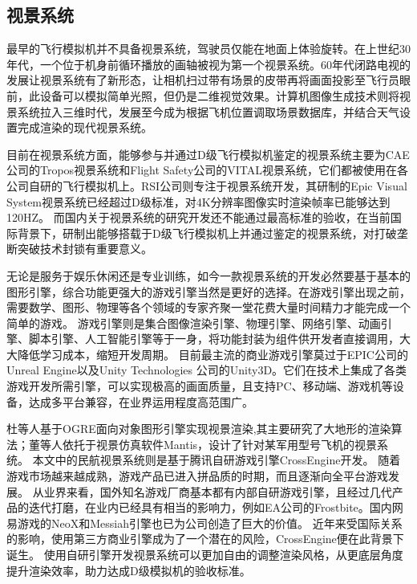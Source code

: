 \subsection{视景系统}
最早的飞行模拟机并不具备视景系统，驾驶员仅能在地面上体验旋转。在上世纪30年代，一个位于机身前循环播放的画轴被视为第一个视景系统。60年代闭路电视的发展让视景系统有了新形态，让相机扫过带有场景的皮带再将画面投影至飞行员眼前\cite{vishis1}，此设备可以模拟简单光照，但仍是二维视觉效果。计算机图像生成技术则将视景系统拉入三维时代，发展至今成为根据飞机位置调取场景数据库，并结合天气设置完成渲染的现代视景系统\cite{vishis2}。
\par
目前在视景系统方面，能够参与并通过D级飞行模拟机鉴定的视景系统主要为CAE公司的Tropos视景系统和Flight Safety公司的VITAL视景系统\cite{vishis3}，它们都被使用在各公司自研的飞行模拟机上。RSI公司则专注于视景系统开发，其研制的Epic Visual System视景系统已经超过D级标准，对4K分辨率图像实时渲染帧率已能够达到120HZ\cite{simhis4}。
而国内关于视景系统的研究开发还不能通过最高标准的验收，在当前国际背景下，研制出能够搭载于D级飞行模拟机上并通过鉴定的视景系统，对打破垄断突破技术封锁有重要意义。
\par
无论是服务于娱乐休闲还是专业训练，如今一款视景系统的开发必然要基于基本的图形引擎，综合功能更强大的游戏引擎当然是更好的选择。在游戏引擎出现之前，需要数学、图形、物理等各个领域的专家齐聚一堂花费大量时间精力才能完成一个简单的游戏\cite{engine2}。
游戏引擎则是集合图像渲染引擎、物理引擎、网络引擎、动画引擎、脚本引擎、人工智能引擎等于一身，将功能封装为组件供开发者直接调用，大大降低学习成本，缩短开发周期\cite{engine3}。
目前最主流的商业游戏引擎莫过于EPIC公司的Unreal Engine以及Unity Technologies 公司的Unity3D。它们在技术上集成了各类游戏开发所需引擎，可以实现极高的画面质量，且支持PC、移动端、游戏机等设备，达成多平台兼容，在业界运用程度高范围广\cite{engine1}。
\par
杜等人基于OGRE面向对象图形引擎实现视景渲染\cite{engine5},其主要研究了大地形的渲染算法；董等人依托于视景仿真软件Mantis，设计了针对某军用型号飞机的视景系统\cite{engine4}。
本文中的民航视景系统则是基于腾讯自研游戏引擎CrossEngine开发。
随着游戏市场越来越成熟，游戏产品已进入拼品质的时期，而且逐渐向全平台游戏发展。
从业界来看，国外知名游戏厂商基本都有内部自研游戏引擎，且经过几代产品的迭代打磨，在业内已经具有相当的影响力，例如EA公司的Frostbite\cite{crossengine}。国内网易游戏的NeoX和Messiah引擎也已为公司创造了巨大的价值。
近年来受国际关系的影响，使用第三方商业引擎成为了一个潜在的风险，CrossEngine便在此背景下诞生。
使用自研引擎开发视景系统可以更加自由的调整渲染风格，从更底层角度提升渲染效率，助力达成D级模拟机的验收标准。
